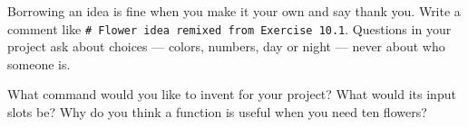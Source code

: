 \begin{tip}
Borrowing an idea is fine when you make it your own and say thank you. Write a comment like \texttt{\# Flower idea remixed from Exercise 10.1}. Questions in your project ask about choices --- colors, numbers, day or night --- never about who someone is.
\end{tip}

\begin{vocab}
\end{vocab}

\begin{reflection}
What command would you like to invent for your project? What would its input slots be?
Why do you think a function is useful when you need ten flowers?
\end{reflection}
